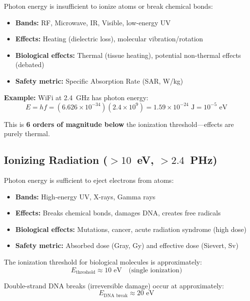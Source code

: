 Photon energy is insufficient to ionize atoms or break chemical bonds:

\begin{itemize}
\item \textbf{Bands:} RF, Microwave, IR, Visible, low-energy UV
\item \textbf{Effects:} Heating (dielectric loss), molecular vibration/rotation
\item \textbf{Biological effects:} Thermal (tissue heating), potential non-thermal effects (debated)
\item \textbf{Safety metric:} Specific Absorption Rate (SAR, W/kg)
\end{itemize}

\textbf{Example:} WiFi at 2.4~GHz has photon energy:
\begin{equation}
E = hf = (6.626 \times 10^{-34})(2.4 \times 10^9) = 1.59 \times 10^{-24} \text{ J} = 10^{-5} \text{ eV}
\end{equation}

This is \textbf{6 orders of magnitude below} the ionization threshold---effects are purely thermal.

\subsection{Ionizing Radiation ($> 10$~eV, $> 2.4$~PHz)}

Photon energy is sufficient to eject electrons from atoms:

\begin{itemize}
\item \textbf{Bands:} High-energy UV, X-rays, Gamma rays
\item \textbf{Effects:} Breaks chemical bonds, damages DNA, creates free radicals
\item \textbf{Biological effects:} Mutations, cancer, acute radiation syndrome (high dose)
\item \textbf{Safety metric:} Absorbed dose (Gray, Gy) and effective dose (Sievert, Sv)
\end{itemize}

The ionization threshold for biological molecules is approximately:
\begin{equation}
E_{\text{threshold}} \approx 10 \text{ eV} \quad \text{(single ionization)}
\end{equation}

Double-strand DNA breaks (irreversible damage) occur at approximately:
\begin{equation}
E_{\text{DNA break}} \approx 20 \text{ eV}
\end{equation}

